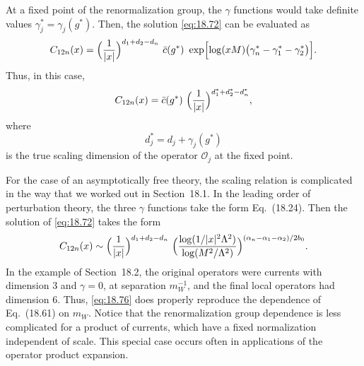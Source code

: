 At a fixed point of the renormalization group, the $\gamma$ functions would
take definite values $\gamma_j^{*} = \gamma_j(g^{*})$.  Then, the solution
\eqref{eq:18.72} can be evaluated as
\begin{equation}
  C_{12n}(x) = \Bigl( \frac{1}{|x|} \Bigr)^{d_1+d_2-d_n}\ \bar{c}(g^{*})\
    \exp\Bigl[ \log(xM)\bigl( \gamma_n^{*} - \gamma_1^{*} - \gamma_2^{*}
      \bigr) \Bigr] .
  \label{eq:18.73}
\end{equation}
Thus, in this case,
\begin{equation}
  C_{12n}(x) = \bar{c}(g^{*})\ \Bigl( \frac{1}{|x|} \Bigr)^{d_1^{*}+d_2^{*}
    - d_n^{*}} ,
  \label{eq:18.74}
\end{equation}
where
\begin{equation}
  d_j^{*} = d_j + \gamma_j(g^{*})
  \label{eq:18.75}
\end{equation}
is the true scaling dimension of the operator $\mathcal{O}_j$ at the fixed
point.

For the case of an asymptotically free theory, the scaling relation is
complicated in the way that we worked out in Section~18.1.  In the leading
order of perturbation theory, the three $\gamma$ functions take the form
Eq.~(18.24).  Then the solution of \eqref{eq:18.72} takes the form
\begin{equation}
  C_{12n}(x) \sim \Bigl( \frac{1}{|x|} \Bigr)^{d_1+d_2-d_n}\ \Bigl(
    \frac{\log(1/|x|^2\Lambda^2)}{\log(M^2/\Lambda^2)} \Bigr)^{
      (\alpha_n-\alpha_1-\alpha_2)/2b_0} .
  \label{eq:18.76}
\end{equation}
In the example of Section~18.2, the original operators were currents with
dimension 3 and $\gamma = 0$, at separation $m_W^{-1}$, and the final local
operators had dimension 6.  Thus, \eqref{eq:18.76} does properly reproduce
the dependence of Eq.~(18.61) on $m_W$.  Notice that the renormalization
group dependence is less complicated for a product of currents, which have a
fixed normalization independent of scale.  This special case occurs often in
applications of the operator product expansion.

